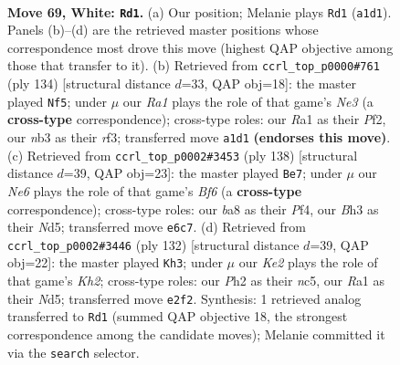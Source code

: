 \documentclass[11pt]{article}
\begin{document}
\clearpage

\begin{figure}[p]\centering
\begin{subfigure}{0.46\textwidth}\centering
\resizebox{\linewidth}{!}{%
\newchessgame
\chessboard[
  setfen={b7/P7/4Nk2/8/1p3P2/1n4PB/4K2P/R7 w - - 6 69},
  showmover=false,
  pgfstyle=straightmove, color=movearrow, markmove={a1-d1}
]}
\caption{}
\end{subfigure}\hfill
\begin{subfigure}{0.46\textwidth}\centering
\resizebox{\linewidth}{!}{%
\newchessgame
\chessboard[
  setfen={8/8/pB2k3/6K1/bP4P1/P3Nr2/5P2/8 w - - 21 68},
  showmover=false,
  pgfstyle=straightmove, color=movearrow, markmove={e3-f5}
]}
\caption{}
\end{subfigure}
\\[4pt]
\begin{subfigure}{0.46\textwidth}\centering
\resizebox{\linewidth}{!}{%
\newchessgame
\chessboard[
  setfen={8/8/3bnBk1/p2N1p2/2P2P1P/5K2/8/8 w - - 0 70},
  showmover=false,
  pgfstyle=straightmove, color=movearrow, markmove={f6-e7}
]}
\caption{}
\end{subfigure}\hfill
\begin{subfigure}{0.46\textwidth}\centering
\resizebox{\linewidth}{!}{%
\newchessgame
\chessboard[
  setfen={8/4Pk2/2b5/2nN4/4P2p/5B2/7K/8 w - - 2 67},
  showmover=false,
  pgfstyle=straightmove, color=movearrow, markmove={h2-h3}
]}
\caption{}
\end{subfigure}
\caption{\textbf{Move 69, White: \texttt{Rd1}.} (a) Our position; Melanie plays \texttt{Rd1} (\texttt{a1d1}). Panels (b)--(d) are the retrieved master positions whose correspondence most drove this move (highest QAP objective among those that transfer to it). (b) Retrieved from \texttt{ccrl\_top\_p0000\#761} (ply 134) [structural distance $d$=33, QAP obj=18]: the master played \texttt{Nf5}; under $\mu$ our \emph{Ra1} plays the role of that game's \emph{Ne3} (a \textbf{cross-type} correspondence); cross-type roles: our \emph{R}a1 as their \emph{P}f2, our \emph{n}b3 as their \emph{r}f3; transferred move \texttt{a1d1} \textbf{(endorses this move)}. (c) Retrieved from \texttt{ccrl\_top\_p0002\#3453} (ply 138) [structural distance $d$=39, QAP obj=23]: the master played \texttt{Be7}; under $\mu$ our \emph{Ne6} plays the role of that game's \emph{Bf6} (a \textbf{cross-type} correspondence); cross-type roles: our \emph{b}a8 as their \emph{P}f4, our \emph{B}h3 as their \emph{N}d5; transferred move \texttt{e6c7}. (d) Retrieved from \texttt{ccrl\_top\_p0002\#3446} (ply 132) [structural distance $d$=39, QAP obj=22]: the master played \texttt{Kh3}; under $\mu$ our \emph{Ke2} plays the role of that game's \emph{Kh2}; cross-type roles: our \emph{P}h2 as their \emph{n}c5, our \emph{R}a1 as their \emph{N}d5; transferred move \texttt{e2f2}. Synthesis: 1 retrieved analog transferred to \texttt{Rd1} (summed QAP objective 18, the strongest correspondence among the candidate moves); Melanie committed it via the \texttt{search} selector.}
\label{fig:thought-m136}
\end{figure}
\end{document}
